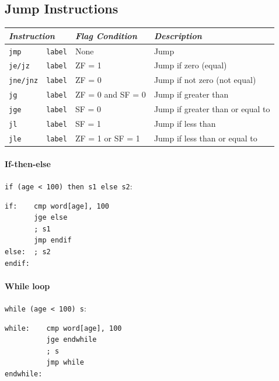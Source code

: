 \documentclass[twocolumn,english]{article}
\providecommand{\tabularnewline}{\\}
\begin{document}
\subsection{Jump Instructions}

\begin{table}[H]
\noindent \centering{}\texttt{\footnotesize{}}%
\begin{tabular}{llll}
\toprule 
\multicolumn{2}{l}{\emph{Instruction}} & \emph{Flag Condition} & \emph{Description}\tabularnewline
\midrule
\texttt{jmp} & \texttt{label} & None & Jump\tabularnewline
\texttt{je/jz} & \texttt{label} & ZF = 1 & Jump if zero (equal)\tabularnewline
\texttt{jne/jnz} & \texttt{label} & ZF = 0 & Jump if not zero (not equal)\tabularnewline
\texttt{jg} & \texttt{label} & ZF = 0 and SF = 0 & Jump if greater than\tabularnewline
\texttt{jge} & \texttt{label} & SF = 0 & Jump if greater than or equal to\tabularnewline
\texttt{jl} & \texttt{label} & SF = 1 & Jump if less than\tabularnewline
\texttt{jle} & \texttt{label} & ZF = 1 or SF = 1 & Jump if less than or equal to\tabularnewline
\bottomrule
\end{tabular}
\end{table}



\paragraph{If-then-else}

\texttt{if (age \textless{} 100) then s1 else s2}:

\noindent 
\begin{lstlisting}[basicstyle={\footnotesize\ttfamily},frame=single]
if:    cmp word[age], 100
       jge else
       ; s1
       jmp endif
else:  ; s2
endif:
\end{lstlisting}



\paragraph{While loop}

\texttt{while (age \textless{} 100) s}:

\noindent 
\begin{lstlisting}[basicstyle={\footnotesize\ttfamily},frame=single]
while:    cmp word[age], 100
          jge endwhile
          ; s
          jmp while
endwhile:
\end{lstlisting}
\end{document}
